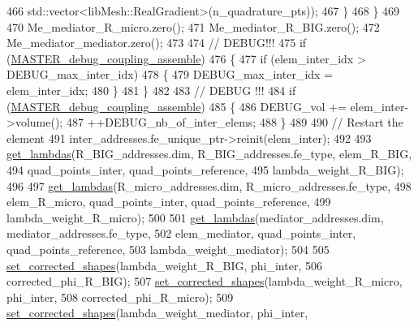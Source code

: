 \begin{DoxyCode}
466                             std::vector<libMesh::RealGradient>(n\_quadrature\_pts));
467                 \}
468             \}
469 
470             Me\_mediator\_R\_micro.zero();
471             Me\_mediator\_R\_BIG.zero();
472             Me\_mediator\_mediator.zero();
473 
474             \textcolor{comment}{// DEBUG!!!}
475             \textcolor{keywordflow}{if} (\hyperlink{assemble__coupling_8h_a3f527e02b01bca9936969241fc053a33}{MASTER\_debug\_coupling\_assemble})
476             \{
477                 \textcolor{keywordflow}{if} (elem\_inter\_idx > DEBUG\_max\_inter\_idx)
478                 \{
479                     DEBUG\_max\_inter\_idx = elem\_inter\_idx;
480                 \}
481             \}
482 
483             \textcolor{comment}{// DEBUG !!!}
484             \textcolor{keywordflow}{if} (\hyperlink{assemble__coupling_8h_a3f527e02b01bca9936969241fc053a33}{MASTER\_debug\_coupling\_assemble})
485             \{
486                 DEBUG\_vol += elem\_inter->volume();
487                 ++DEBUG\_nb\_of\_inter\_elems;
488             \}
489 
490             \textcolor{comment}{// Restart the element}
491             inter\_addresses.fe\_unique\_ptr->reinit(elem\_inter);
492 
493             \hyperlink{classcarl_1_1assemble__coupling__matrices_a27ee998dbd1a87b1ce4d1e9c9e515e43}{get\_lambdas}(R\_BIG\_addresses.dim, R\_BIG\_addresses.fe\_type, elem\_R\_BIG,
494                     quad\_points\_inter, quad\_points\_reference,
495                     lambda\_weight\_R\_BIG);
496 
497             \hyperlink{classcarl_1_1assemble__coupling__matrices_a27ee998dbd1a87b1ce4d1e9c9e515e43}{get\_lambdas}(R\_micro\_addresses.dim, R\_micro\_addresses.fe\_type,
498                     elem\_R\_micro, quad\_points\_inter, quad\_points\_reference,
499                     lambda\_weight\_R\_micro);
500 
501             \hyperlink{classcarl_1_1assemble__coupling__matrices_a27ee998dbd1a87b1ce4d1e9c9e515e43}{get\_lambdas}(mediator\_addresses.dim, mediator\_addresses.fe\_type,
502                     elem\_mediator, quad\_points\_inter, quad\_points\_reference,
503                     lambda\_weight\_mediator);
504 
505             \hyperlink{classcarl_1_1assemble__coupling__matrices_a677a3527845b3503cc5f5daa8de63864}{set\_corrected\_shapes}(lambda\_weight\_R\_BIG, phi\_inter,
506                     corrected\_phi\_R\_BIG);
507             \hyperlink{classcarl_1_1assemble__coupling__matrices_a677a3527845b3503cc5f5daa8de63864}{set\_corrected\_shapes}(lambda\_weight\_R\_micro, phi\_inter,
508                     corrected\_phi\_R\_micro);
509             \hyperlink{classcarl_1_1assemble__coupling__matrices_a677a3527845b3503cc5f5daa8de63864}{set\_corrected\_shapes}(lambda\_weight\_mediator, phi\_inter,

\end{DoxyCode}
